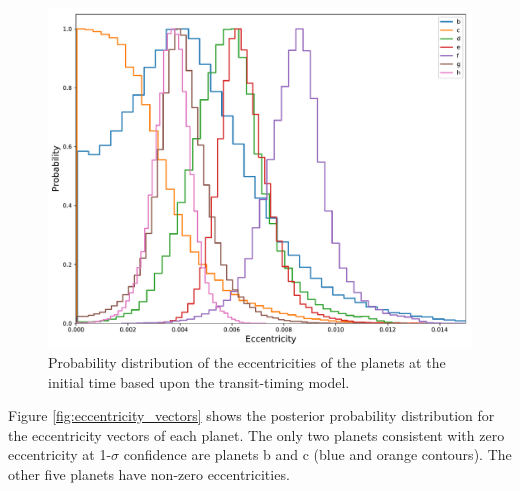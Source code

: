 \documentclass[fleqn,usenatbib]{mnras} %
\begin{document}

\begin{figure}
    \centering
    \includegraphics[width=\hsize]{figures/eccentricity_posterior.pdf}
    \caption{Probability distribution of the eccentricities of the planets at the initial time
    based upon the transit-timing model.}
    \label{fig:eccentricity_posterior}
\end{figure}


Figure \ref{fig:eccentricity_vectors} shows the posterior probability distribution 
for the eccentricity vectors of each planet.  The only two planets consistent with 
zero eccentricity at 1-$\sigma$ confidence are planets b and
c (blue and orange contours).  The other five planets have non-zero eccentricities.
\end{document}
